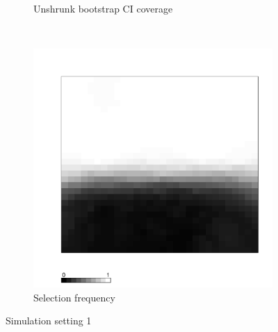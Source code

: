 \documentclass[authoryear, review, 11pt]{elsarticle}
\begin{document}
\begin{figure}
\begin{subfigure}[b]{0.45\textwidth}
		\caption{Unshrunk bootstrap CI coverage}
	\end{subfigure}%
	~ %
	\begin{subfigure}[b]{0.45\textwidth}
	\centering
		\includegraphics[width=\textwidth]{../../figures/simulation/X1.15.1.selection.pdf}
		\caption{Selection frequency}
	\end{subfigure}
	\caption{Simulation setting 1}
\end{figure}

\clearpage
\end{document}
